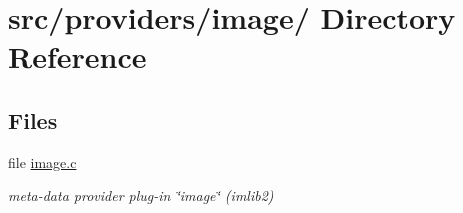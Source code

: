 \hypertarget{dir_000028}{
\section{src/providers/image/ Directory Reference}
\label{dir_000028}
}
\subsection*{Files}
\begin{CompactItemize}
\item 
file \hyperlink{image_8c}{image.c}
\begin{CompactList}\small\item\em meta-data provider plug-in \char`\"{}image\char`\"{} (imlib2) \item\end{CompactList}

\end{CompactItemize}
